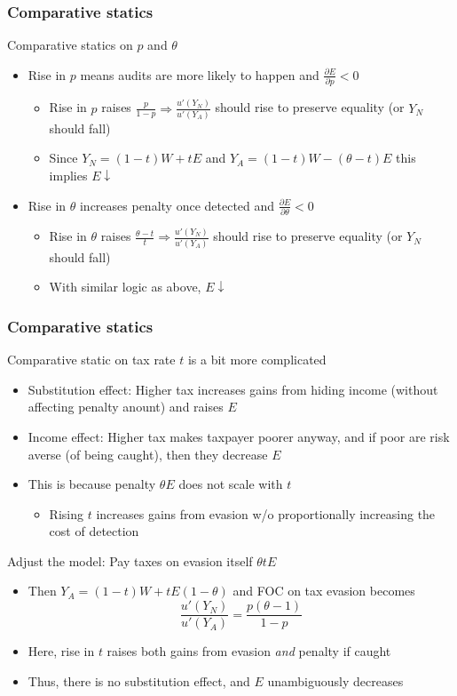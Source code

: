 \documentclass[aspectratio=169]{beamer}
\begin{document}
\begin{frame}
  \frametitle{Comparative statics}
  Comparative statics on $p$ and $\theta$
   \begin{itemize}\setlength\itemsep{3pt}
\item Rise in $p$ means audits are more likely to happen and $\frac{\partial E}{\partial p}<0$
\begin{itemize}\setlength\itemsep{3pt}
  \item Rise in $p$ raises $\frac{p}{1-p}  \Rightarrow\frac{u'(Y_N)}{u'(Y_A)}$ should rise to preserve equality (or $Y_N$ should fall)
  \item Since $Y_N=(1-t)W+tE$ and $Y_A=(1-t)W - (\theta-t)E$ this implies $E\downarrow$
\end{itemize}
\item Rise in $\theta$ increases penalty once detected and $\frac{\partial E}{\partial \theta}<0$
\begin{itemize}\setlength\itemsep{3pt}
  \item Rise in $\theta$ raises $\frac{\theta-t}{t}  \Rightarrow\frac{u'(Y_N)}{u'(Y_A)}$ should rise to preserve equality (or $Y_N$ should fall)
  \item With similar logic as above, $E\downarrow$
\end{itemize}
\end{itemize}
\end{frame}



\begin{frame}
  \frametitle{Comparative statics}
Comparative static on tax rate $t$ is a bit more complicated
\begin{itemize}\setlength\itemsep{3pt}
  \item Substitution effect: Higher tax increases gains from hiding income (without affecting penalty anount) and raises $E$
  \item Income effect: Higher tax makes taxpayer poorer anyway, and if poor are risk averse (of being caught), then they decrease $E$ 
\item This is because penalty $\theta E$ does not scale with $t$
\begin{itemize}
  \item Rising $t$  increases gains from evasion w/o proportionally increasing the cost of detection
\end{itemize}
\end{itemize}\medskip
Adjust the model: Pay taxes on evasion itself $\theta t E$
\begin{itemize}\setlength\itemsep{3pt}
  \item Then $Y_A=(1-t)W + tE(1-\theta)$ and  FOC on tax evasion becomes
  \[
  \frac{u'(Y_N)}{u'(Y_A)}= \frac{p(\theta-1)}{1-p}
  \]
  \item Here, rise in $t$ raises both gains from evasion \textit{and} penalty if caught
 \item Thus, there is no substitution effect, and $E$ unambiguously decreases
\end{itemize}
\end{frame}
\end{document}
